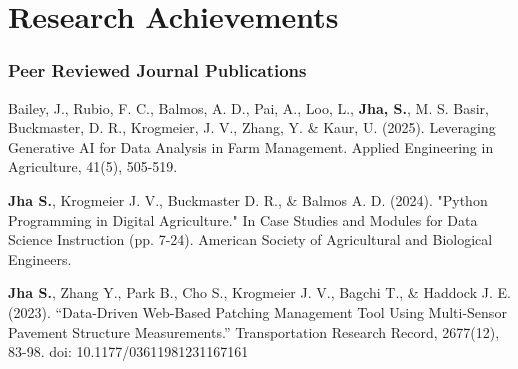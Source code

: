 \documentclass[10pt]{article}
\begin{document}
\section{Research Achievements}
\vspace{-0.9 em}

\subsubsection{Peer Reviewed Journal Publications}
\begin{enumerate}[label={[\arabic*]}, leftmargin=3em, itemsep=0pt, topsep=0pt]
    \item Bailey, J., Rubio, F. C., Balmos, A. D., Pai, A., Loo, L., \textbf{Jha, S.}, M. S. Basir, Buckmaster, D. R., Krogmeier, J. V., Zhang, Y. \& Kaur, U. (2025). Leveraging Generative AI for Data Analysis in Farm Management. Applied Engineering in Agriculture, 41(5), 505-519.
    \item \textbf{Jha S.}, Krogmeier J. V., Buckmaster D. R., \& Balmos A. D. (2024). "Python Programming in Digital Agriculture." In Case Studies and Modules for Data Science Instruction (pp. 7-24). American Society of Agricultural and Biological Engineers.
    \item \textbf{Jha S.}, Zhang Y., Park B., Cho S., Krogmeier J. V., Bagchi T., \& Haddock J. E. (2023). “Data-Driven Web-Based Patching Management Tool Using Multi-Sensor Pavement Structure Measurements.” Transportation Research Record, 2677(12), 83-98. doi: 10.1177/03611981231167161
\end{enumerate}

\vspace{1 em}
\end{document}
